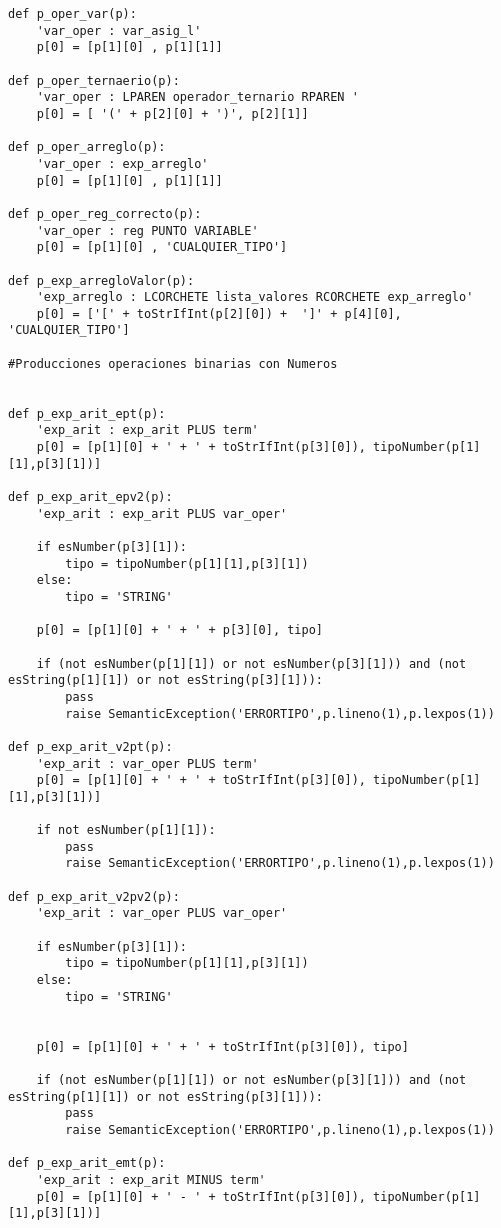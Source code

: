 \begin{verbatim}
def p_oper_var(p):
    'var_oper : var_asig_l'
    p[0] = [p[1][0] , p[1][1]]

def p_oper_ternaerio(p):
    'var_oper : LPAREN operador_ternario RPAREN '
    p[0] = [ '(' + p[2][0] + ')', p[2][1]]

def p_oper_arreglo(p):
    'var_oper : exp_arreglo'
    p[0] = [p[1][0] , p[1][1]]

def p_oper_reg_correcto(p):
    'var_oper : reg PUNTO VARIABLE'
    p[0] = [p[1][0] , 'CUALQUIER_TIPO']

def p_exp_arregloValor(p):
    'exp_arreglo : LCORCHETE lista_valores RCORCHETE exp_arreglo'
    p[0] = ['[' + toStrIfInt(p[2][0]) +  ']' + p[4][0], 'CUALQUIER_TIPO']

#Producciones operaciones binarias con Numeros


def p_exp_arit_ept(p):
    'exp_arit : exp_arit PLUS term'
    p[0] = [p[1][0] + ' + ' + toStrIfInt(p[3][0]), tipoNumber(p[1][1],p[3][1])]

def p_exp_arit_epv2(p):
    'exp_arit : exp_arit PLUS var_oper'

    if esNumber(p[3][1]):
        tipo = tipoNumber(p[1][1],p[3][1])
    else:
        tipo = 'STRING' 

    p[0] = [p[1][0] + ' + ' + p[3][0], tipo]

    if (not esNumber(p[1][1]) or not esNumber(p[3][1])) and (not esString(p[1][1]) or not esString(p[3][1])):
        pass
        raise SemanticException('ERRORTIPO',p.lineno(1),p.lexpos(1))

def p_exp_arit_v2pt(p):
    'exp_arit : var_oper PLUS term'
    p[0] = [p[1][0] + ' + ' + toStrIfInt(p[3][0]), tipoNumber(p[1][1],p[3][1])]

    if not esNumber(p[1][1]):
        pass
        raise SemanticException('ERRORTIPO',p.lineno(1),p.lexpos(1))

def p_exp_arit_v2pv2(p):
    'exp_arit : var_oper PLUS var_oper'

    if esNumber(p[3][1]):
        tipo = tipoNumber(p[1][1],p[3][1])
    else:
        tipo = 'STRING' 
    

    p[0] = [p[1][0] + ' + ' + toStrIfInt(p[3][0]), tipo]

    if (not esNumber(p[1][1]) or not esNumber(p[3][1])) and (not esString(p[1][1]) or not esString(p[3][1])):
        pass
        raise SemanticException('ERRORTIPO',p.lineno(1),p.lexpos(1))

def p_exp_arit_emt(p):
    'exp_arit : exp_arit MINUS term'
    p[0] = [p[1][0] + ' - ' + toStrIfInt(p[3][0]), tipoNumber(p[1][1],p[3][1])]



\end{verbatim}
